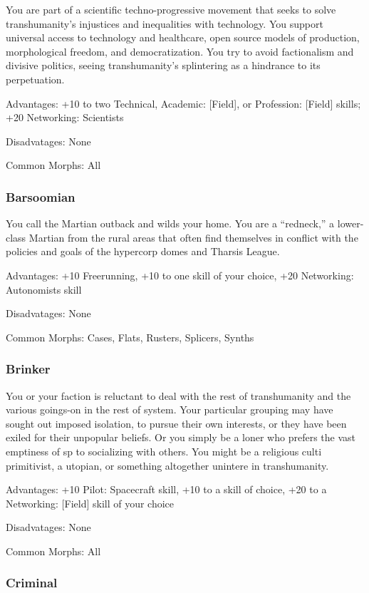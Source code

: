 You are part of a scientific techno-progressive movement that seeks to solve transhumanity’s injustices and inequalities with technology. You support universal access to technology and healthcare, open source models of production, morphological freedom, and democratization. You try to avoid factionalism and divisive politics, seeing transhumanity’s splintering as a hindrance to its perpetuation.

Advantages: +10 to two Technical, Academic: [Field], or Profession: [Field] skills; +20 Networking: Scientists

Disadvatages: None

Common Morphs: All

\subsubsection{Barsoomian}
\label{sec:barsoomian}

You call the Martian outback and wilds your home. You are a “redneck,” a lower-class Martian from the rural areas that often find themselves in conflict with the policies and goals of the hypercorp domes and Tharsis League. %

Advantages: +10 Freerunning, +10 to one skill of your choice, +20 Networking: Autonomists skill

Disadvatages: None

Common Morphs: Cases, Flats, Rusters, Splicers, Synths

\subsubsection{Brinker}
\label{sec:brinker}

You or your faction is reluctant to deal with the rest of transhumanity and the various goings-on in the rest of system. Your particular grouping may have sought out imposed isolation, to pursue their own interests, or they have been exiled for their unpopular beliefs. Or you simply be a loner who prefers the vast emptiness of sp to socializing with others. You might be a religious culti primitivist, a utopian, or something altogether unintere in transhumanity.

Advantages: +10 Pilot: Spacecraft skill, +10 to a skill of choice, +20 to a Networking: [Field] skill of your choice

Disadvatages: None

Common Morphs: All

\subsubsection{Criminal}
\label{sec:criminal}

